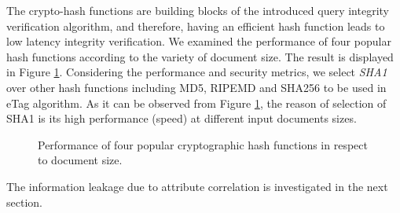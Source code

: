 The crypto-hash functions are building blocks of the introduced query integrity verification algorithm, and therefore, having an efficient hash function leads to low latency integrity verification. We examined the performance of four popular hash functions according to the variety of document size. The result is displayed in Figure \ref{fig:hashPerformance}. Considering the performance and security metrics, we select \emph{SHA1} over other hash functions including MD5, RIPEMD and SHA256 to be used in eTag algorithm. As it can be observed from Figure \ref{fig:hashPerformance}, the reason of selection of SHA1 is its high performance (speed) at different input documents sizes.

\begin{figure}[H]
\centering
\resizebox{0.6\textwidth}{!}{}
\caption{Performance of four popular cryptographic hash functions in respect to document size.}
\label{fig:hashPerformance}
\end{figure}

\noindent The information leakage due to attribute correlation is investigated in the next section.

